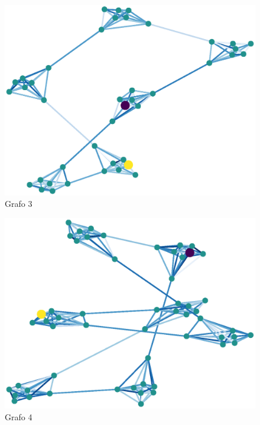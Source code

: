 \documentclass{article}
\begin{document}
\begin{figure}[H]
    \includegraphics[width=\textwidth]{grafo-3}
    \caption{Grafo 3}
    \label{fig:matriz}
\end{figure}
\begin{figure}[H]
    \includegraphics[width=\textwidth]{grafo-4}
    \caption{Grafo 4}
    \label{fig:matriz}
\end{figure}
\end{document}
